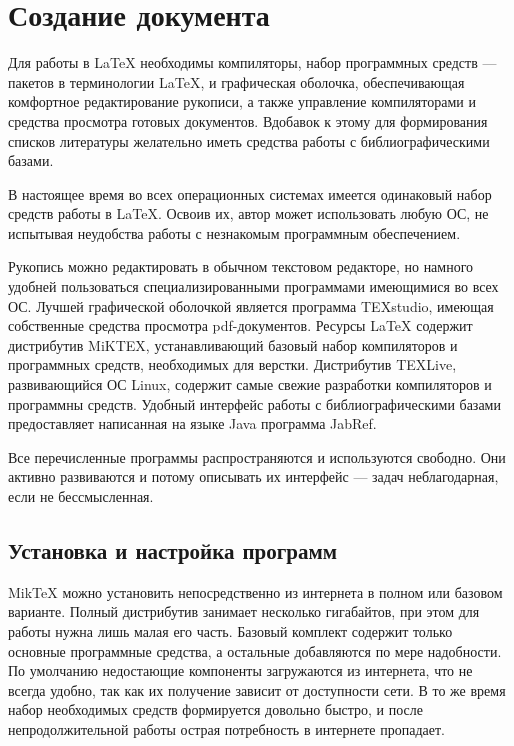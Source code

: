 \documentclass[a4paper, 14pt]{extarticle}
\newcommand{\n}{\par}
\begin{document}
	\section{Создание документа}
	Для работы в \LaTeX{} необходимы компиляторы, набор программных средств — пакетов в терминологии \LaTeX{}, и графическая оболочка, обеспечивающая комфортное редактирование рукописи, а также управление компиляторами и средства просмотра готовых документов. Вдобавок к этому для формирования списков литературы желательно иметь средства работы с библиографическими базами.\n
	
	В настоящее время во всех операционных системах имеется одинаковый набор средств работы в \LaTeX{}. Освоив их, автор может использовать любую ОС, не испытывая неудобства работы с незнакомым программным обеспечением.\n
	
	Рукопись можно редактировать в обычном текстовом редакторе, но намного удобней пользоваться специализированными программами имеющимися во всех ОС. Лучшей графической оболочкой является программа TEXstudio, имеющая собственные средства просмотра pdf-документов. Ресурсы \LaTeX{} содержит дистрибутив MiKTEX, устанавливающий базовый набор компиляторов и программных средств, необходимых для верстки. Дистрибутив TEXLive, развивающийся ОС Linux, содержит самые свежие разработки компиляторов и программны средств. Удобный интерфейс работы с библиографическими базами предоставляет написанная на языке Java программа JabRef.\n
	
	Все перечисленные программы распространяются и используются свободно. Они активно развиваются и потому описывать их интерфейс — задач неблагодарная, если не бессмысленная.
	
	\subsection*{Установка и настройка программ} 
	MikTeX можно установить непосредственно из интернета в полном или базовом варианте. Полный дистрибутив занимает несколько гигабайтов, при этом для работы нужна лишь малая его часть. Базовый комплект содержит только основные программные средства, а остальные добавляются по мере надобности. По умолчанию недостающие компоненты загружаются из интернета, что не всегда удобно, так как их получение зависит от доступности сети. В то же время набор необходимых средств формируется довольно быстро, и после непродолжительной работы острая потребность в интернете пропадает.\n
	
\end{document}
